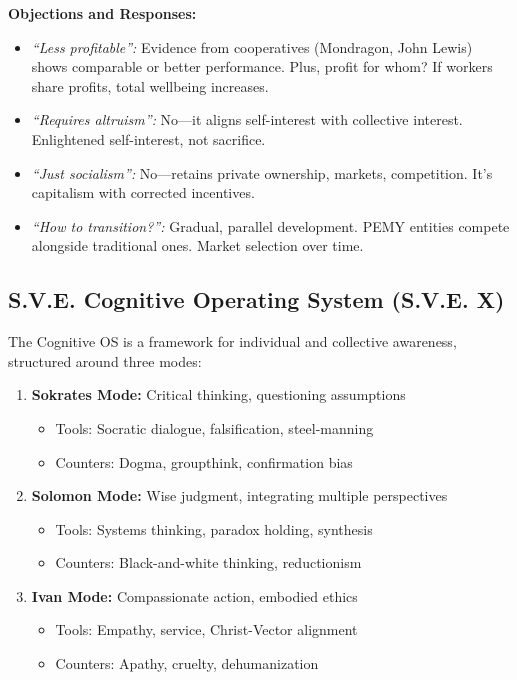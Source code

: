 \documentclass[11pt,a4paper]{article}
\theoremstyle{definition}
\theoremstyle{remark}
\begin{document}
\textbf{Objections and Responses:}
\begin{itemize}
    \item \textit{``Less profitable'':} Evidence from cooperatives (Mondragon, John Lewis) shows comparable or better performance. Plus, profit for whom? If workers share profits, total wellbeing increases.
    \item \textit{``Requires altruism'':} No---it aligns self-interest with collective interest. Enlightened self-interest, not sacrifice.
    \item \textit{``Just socialism'':} No---retains private ownership, markets, competition. It's capitalism with corrected incentives.
    \item \textit{``How to transition?'':} Gradual, parallel development. PEMY entities compete alongside traditional ones. Market selection over time.
\end{itemize}

\subsection{S.V.E. Cognitive Operating System (S.V.E. X)}

The Cognitive OS \cite{sve10} is a framework for individual and collective awareness, structured around three modes:

\begin{enumerate}
    \item \textbf{Sokrates Mode:} Critical thinking, questioning assumptions
    \begin{itemize}
        \item Tools: Socratic dialogue, falsification, steel-manning
        \item Counters: Dogma, groupthink, confirmation bias
    \end{itemize}
    
    \item \textbf{Solomon Mode:} Wise judgment, integrating multiple perspectives
    \begin{itemize}
        \item Tools: Systems thinking, paradox holding, synthesis
        \item Counters: Black-and-white thinking, reductionism
    \end{itemize}
    
    \item \textbf{Ivan Mode:} Compassionate action, embodied ethics
    \begin{itemize}
        \item Tools: Empathy, service, Christ-Vector alignment
        \item Counters: Apathy, cruelty, dehumanization
    \end{itemize}
\end{enumerate}
\end{document}
